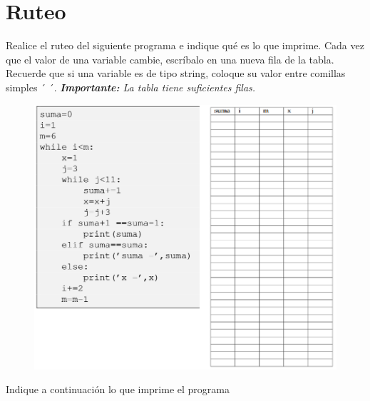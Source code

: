 \section{Ruteo}

Realice el ruteo del siguiente programa e indique qué es lo que imprime. Cada vez que el valor de una variable cambie, escríbalo en una nueva fila de la tabla. Recuerde que si una variable es de tipo string, coloque su valor entre comillas simples ´  ´.
\textit{\textbf{Importante:} La tabla tiene suficientes filas.}

\begin{figure}[H]
    \centering
    \includegraphics[width=\textwidth]{Guia/ruteo.png}
\end{figure}

Indique a continuación lo que imprime el programa